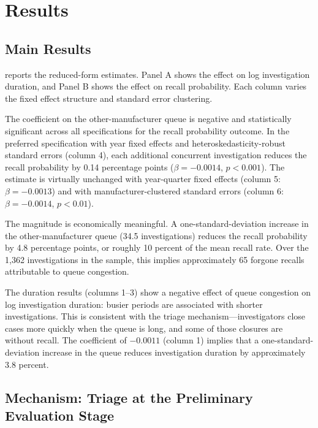 \documentclass[12pt]{article}
\begin{document}
\section{Results}

\subsection{Main Results}

 reports the reduced-form estimates. Panel A shows the effect on log investigation duration, and Panel B shows the effect on recall probability. Each column varies the fixed effect structure and standard error clustering.



The coefficient on the other-manufacturer queue is negative and statistically significant across all specifications for the recall probability outcome. In the preferred specification with year fixed effects and heteroskedasticity-robust standard errors (column 4), each additional concurrent investigation reduces the recall probability by 0.14 percentage points ($\beta = -0.0014$, $p < 0.001$). The estimate is virtually unchanged with year-quarter fixed effects (column 5: $\beta = -0.0013$) and with manufacturer-clustered standard errors (column 6: $\beta = -0.0014$, $p < 0.01$).

The magnitude is economically meaningful. A one-standard-deviation increase in the other-manufacturer queue (34.5 investigations) reduces the recall probability by 4.8 percentage points, or roughly 10 percent of the mean recall rate. Over the 1,362 investigations in the sample, this implies approximately 65 forgone recalls attributable to queue congestion.

The duration results (columns 1--3) show a negative effect of queue congestion on log investigation duration: busier periods are associated with shorter investigations. This is consistent with the triage mechanism---investigators close cases more quickly when the queue is long, and some of those closures are without recall. The coefficient of $-0.0011$ (column 1) implies that a one-standard-deviation increase in the queue reduces investigation duration by approximately 3.8 percent.

\subsection{Mechanism: Triage at the Preliminary Evaluation Stage}
\end{document}
